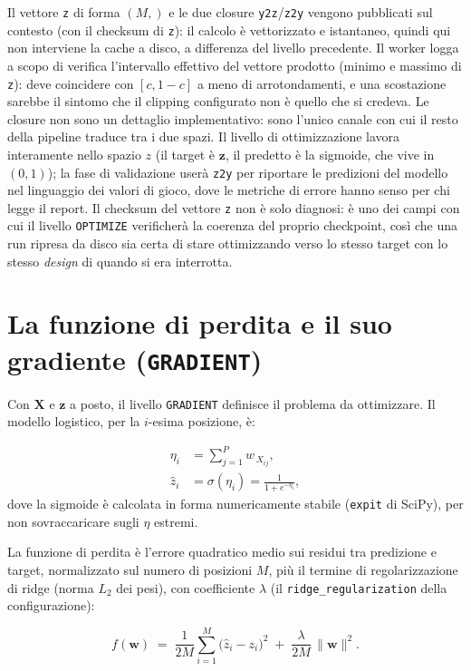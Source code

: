 Il vettore \texttt{z} di forma $(M,)$ e le due closure \texttt{y2z}/\texttt{z2y}
vengono pubblicati sul contesto (con il checksum di \texttt{z}): il calcolo è
vettorizzato e istantaneo, quindi qui non interviene la cache a disco, a
differenza del livello precedente. Il worker logga a scopo di verifica
l'intervallo effettivo del vettore prodotto (minimo e massimo di
\texttt{z}): deve coincidere con $[c, 1-c]$ a meno di arrotondamenti, e una
scostazione sarebbe il sintomo che il clipping configurato non è quello che
si credeva. Le closure non sono un dettaglio
implementativo: sono l'unico canale con cui il resto della pipeline traduce
tra i due spazi. Il livello di ottimizzazione lavora interamente nello spazio
$z$ (il target è $\bm{z}$, il predetto è la sigmoide, che vive in $(0,1)$);
la fase di validazione userà \texttt{z2y} per riportare le predizioni del
modello nel linguaggio dei valori di gioco, dove le metriche di errore hanno
senso per chi legge il report. Il checksum del vettore \texttt{z} non è solo
diagnosi: è uno dei campi con cui il livello \texttt{OPTIMIZE} verificherà
la coerenza del proprio checkpoint, così che una run ripresa da disco sia
certa di stare ottimizzando verso lo stesso target con lo stesso
\emph{design} di quando si era interrotta.

\section{La funzione di perdita e il suo gradiente (\texttt{GRADIENT})}

Con $\bm{X}$ e $\bm{z}$ a posto, il livello \texttt{GRADIENT} definisce il
problema da ottimizzare. Il modello logistico, per la $i$-esima posizione, è:

\begin{align}
  \eta_i &= \sum_{j=1}^{P} w_{\,X_{ij}} ,
  \label{eq:linear-predictor}\\
  \hat z_i &= \sigma(\eta_i) = \frac{1}{1 + e^{-\eta_i}} ,
  \label{eq:sigmoid-predict}
\end{align}
dove la sigmoide è calcolata in forma numericamente stabile
(\texttt{expit} di SciPy), per non sovraccaricare sugli $\eta$ estremi.

La funzione di perdita è l'errore quadratico medio sui residui tra predizione
e target, normalizzato sul numero di posizioni $M$, più il termine di
regolarizzazione di ridge (norma $L_2$ dei pesi), con coefficiente
$\lambda$ (il \texttt{ridge\_regularization} della configurazione):

\begin{equation}
  f(\bm{w}) \;=\;
  \frac{1}{2M}\sum_{i=1}^{M}\bigl(\hat z_i - z_i\bigr)^{2}
  \;+\; \frac{\lambda}{2M}\,\lVert\bm{w}\rVert^{2} .
  \label{eq:loss}
\end{equation}

